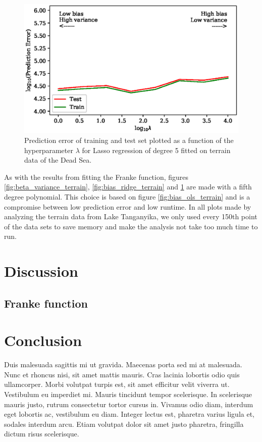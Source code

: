 \documentclass[a4paper, 10pt]{article}
\begin{document}
\begin{figure}[H]
    \includegraphics{figs/biasvariancetradeoff_LASSO_terrain.eps}
    \caption{Prediction error of training and test set plotted as a function of the hyperparameter $\lambda$ for Lasso regression of degree 5 fitted on terrain data of the Dead Sea.}
    \label{fig:bias_lasso_terrain}
\end{figure}
As with the results from fitting the Franke function, figures \ref{fig:beta_variance_terrain}, \ref{fig:bias_ridge_terrain} and \ref{fig:bias_lasso_terrain} are made with a fifth degree polynomial. This choice is based on figure \ref{fig:bias_ols_terrain} and is a compromise between low prediction error and low runtime. In all plots made by analyzing the terrain data from Lake Tanganyika, we only used every 150th point of the data sets to save memory and make the analysis not take too much time to run.
\begin{multicols}{2}





\section{Discussion}
\subsection{Franke function}


\section{Conclusion}
Duis malesuada sagittis mi ut gravida. Maecenas porta sed mi at malesuada. Nunc et rhoncus nisi, sit amet mattis mauris. Cras lacinia lobortis odio quis ullamcorper. Morbi volutpat turpis est, sit amet efficitur velit viverra ut. Vestibulum eu imperdiet mi. Mauris tincidunt tempor scelerisque. In scelerisque mauris justo, rutrum consectetur tortor cursus in. Vivamus odio diam, interdum eget lobortis ac, vestibulum eu diam. Integer lectus est, pharetra varius ligula et, sodales interdum arcu. Etiam volutpat dolor sit amet justo pharetra, fringilla dictum risus scelerisque.
\end{multicols}
\end{document}
